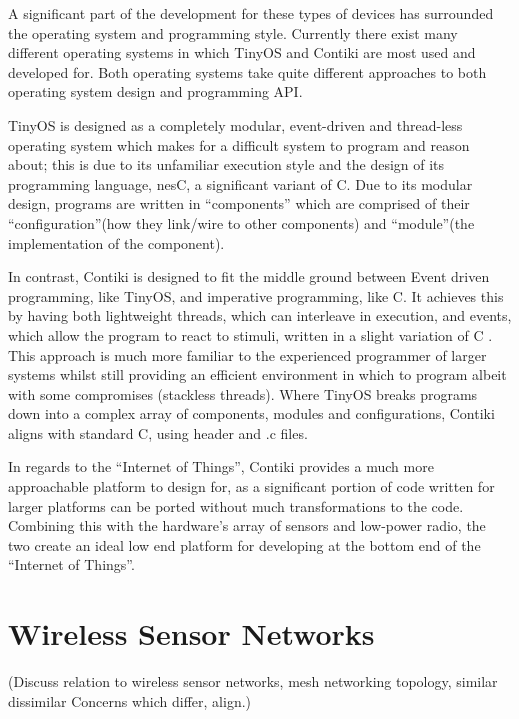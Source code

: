 A significant part of the development for these types of devices has surrounded the operating system and programming style. Currently there exist many different operating systems in which TinyOS and Contiki are most used and developed for. Both operating systems take quite different approaches to both operating system design and programming API. 

TinyOS is designed as a completely modular, event-driven and thread-less operating system which makes for a difficult system to program and reason about; this is due to its unfamiliar execution style and the design of its programming language, nesC, a significant variant of C. Due to its modular design, programs are written in ``components'' which are comprised of their ``configuration''(how they link/wire to other components) and ``module''(the implementation of the component). 

In contrast, Contiki is designed to fit the middle ground between Event driven programming, like TinyOS, and imperative programming, like C. It achieves this by having both lightweight threads, which can interleave in execution, and events, which allow the program to react to stimuli, written in a slight variation of C \cite{ContikiPaper}. This approach is much more familiar to the experienced programmer of larger systems whilst still providing an efficient environment in which to program albeit with some compromises (stackless threads). Where TinyOS breaks programs down into a complex array of components, modules and configurations, Contiki aligns with standard C, using header and .c files.

In regards to the ``Internet of Things'', Contiki provides a much more approachable platform to design for, as a significant portion of code written for larger platforms can be ported without much transformations to the code. Combining this with the hardware's array of sensors and low-power radio, the two create an ideal low end platform for developing at the bottom end of the ``Internet of Things''.

\section{Wireless Sensor Networks} %
\label{sec:wireless_sensor_networks}
(Discuss relation to wireless sensor networks, mesh networking topology, similar dissimilar
Concerns which differ, align.)

